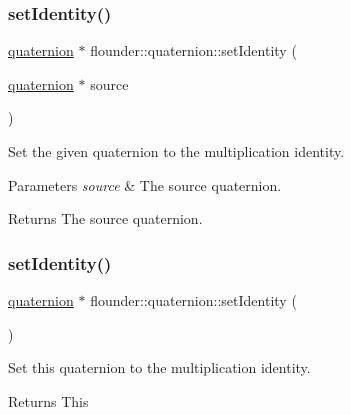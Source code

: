 \subsubsection{\texorpdfstring{set\+Identity()}{setIdentity()}\hspace{0.1cm}{\footnotesize\ttfamily [1/2]}}
{\footnotesize\ttfamily \hyperlink{classflounder_1_1quaternion}{quaternion} $\ast$ flounder\+::quaternion\+::set\+Identity (\begin{DoxyParamCaption}\item[{\hyperlink{classflounder_1_1quaternion}{quaternion} $\ast$}]{source }\end{DoxyParamCaption})\hspace{0.3cm}{\ttfamily [static]}}



Set the given quaternion to the multiplication identity. 


\begin{DoxyParams}{Parameters}
{\em source} & The source quaternion. \\
\hline
\end{DoxyParams}
\begin{DoxyReturn}{Returns}
The source quaternion. 
\end{DoxyReturn}
\mbox{\label{classflounder_1_1quaternion_a109c607ac1b280a9f552afc57cac1df0}} 
\subsubsection{\texorpdfstring{set\+Identity()}{setIdentity()}\hspace{0.1cm}{\footnotesize\ttfamily [2/2]}}
{\footnotesize\ttfamily \hyperlink{classflounder_1_1quaternion}{quaternion} $\ast$ flounder\+::quaternion\+::set\+Identity (\begin{DoxyParamCaption}{ }\end{DoxyParamCaption})}



Set this quaternion to the multiplication identity. 

\begin{DoxyReturn}{Returns}
This 
\end{DoxyReturn}
\mbox{\label{classflounder_1_1quaternion_a2280b2fd696e25f4384da5f080e5b8d3}} 
